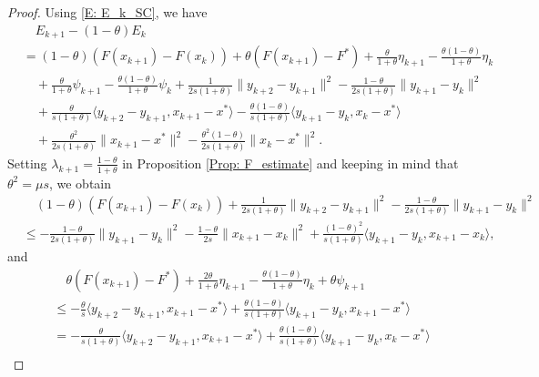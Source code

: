 \documentclass[10pt,a4paper]{amsart}
\begin{document}
\begin{proof}
Using \eqref{E: E_k_SC}, we have
\begin{equation}\label{E: E_k_diff_SC}
\begin{aligned}
&\quad E_{k+1} - (1-\theta)E_k \\
&= (1-\theta)\left(F(x_{k+1}) - F(x_k)\right) + \theta\left( F(x_{k+1}) - F^* \right)
   + \frac{\theta}{1+\theta}\eta_{k+1}  
   - \frac{\theta(1-\theta)}{1+\theta}\eta_k\\
&\quad + \frac{\theta}{1+\theta}\psi_{k+1} 
  - \frac{\theta(1-\theta)}{1+\theta}\psi_k 
  + \frac{1}{2s(1+\theta)}\| y_{k+2} - y_{k+1} \|^2 - \frac{1-\theta}{2s(1+\theta)}\| y_{k+1} - y_k \|^2 \\
&\quad  + \frac{\theta}{s(1+\theta)} \langle y_{k+2}-y_{k+1}, x_{k+1}-x^* \rangle - \frac{\theta(1-\theta)}{s(1+\theta)}\langle y_{k+1} - y_k, x_k-x^* \rangle \\
&\quad + \frac{\theta^2}{2s(1+\theta)}\| x_{k+1} - x^* \|^2 - \frac{\theta^2(1-\theta)}{2s(1+\theta)}\| x_k - x^* \|^2.
\end{aligned}
\end{equation}
Setting $\lambda_{k+1} = \frac{1-\theta}{1+\theta}$ in Proposition \ref{Prop: F_estimate} and keeping in mind that $\theta^2=\mu s$, we obtain
\begin{equation}\label{E: func_gap_SC}
\begin{aligned}
&\quad (1-\theta)\left(F(x_{k+1}) - F(x_k) \right) + \frac{1}{2s(1+\theta)}\| y_{k+2} - y_{k+1} \|^2 - \frac{1-\theta}{2s(1+\theta)}\| y_{k+1} - y_k \|^2 \\
&\le - \frac{1-\theta}{2s(1+\theta)}\| y_{k+1} - y_k \|^2 - \frac{1-\theta}{2s}\| x_{k+1}-x_k \|^2 
+ \frac{(1-\theta)^2}{s(1+\theta)}\langle y_{k+1}-y_k, x_{k+1}-x_k \rangle, 
\end{aligned}
\end{equation} 
and
\begin{equation}\label{E: func_value_SC}
\begin{aligned}
&\quad \theta\left( F(x_{k+1}) - F^* \right) + \frac{2\theta}{1+\theta}\eta_{k+1} - \frac{\theta(1-\theta)}{1+\theta}\eta_k + \theta\psi_{k+1}\\
&\le -\frac{\theta}{s}\langle y_{k+2}-y_{k+1}, x_{k+1}-x^* \rangle + \frac{\theta(1-\theta)}{s(1+\theta)}\langle y_{k+1}-y_k, x_{k+1}-x^* \rangle \\
&= -\frac{\theta}{s(1+\theta)}\langle y_{k+2}-y_{k+1}, x_{k+1}-x^* \rangle
   + \frac{\theta(1-\theta)}{s(1+\theta)}\langle y_{k+1}-y_k, x_k-x^* \rangle \\

\end{aligned}
\end{equation}
\end{proof}
\end{document}
